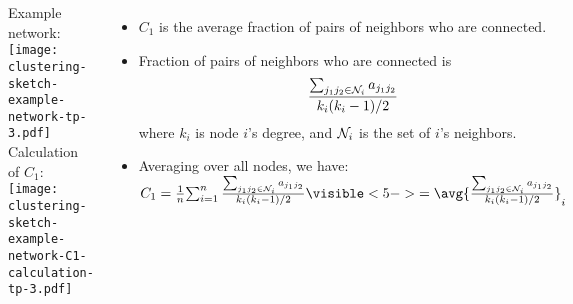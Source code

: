 \begin{frame}

  \begin{block}{}
  \begin{columns}
    Example network:\\
    \texttt{[image: clustering-sketch-example-network-tp-3.pdf]}\\
    Calculation of $C_1$:\\
    \texttt{[image: clustering-sketch-example-network-C1-calculation-tp-3.pdf]}
    \begin{itemize}
    \item<2-> $C_1$ is the \alert{average fraction of 
        pairs of neighbors who are connected}.
    \item<3-> Fraction of pairs of neighbors who are connected is
      $$ \frac{\sum_{j_1 j_2 \in {\cal N}_i} a_{j_1 j_2}}{k_i(k_i-1)/2} $$
      where
      $k_i$ is node $i$'s degree, and 
      ${\cal N}_i$ is the set of $i$'s neighbors.
    \item<4->
      Averaging over all nodes, we have:\\
      $ C_1 = \frac{1}{n}{\sum_{i=1}^{n}\frac{\sum_{j_1 j_2 \in {\cal N}_i} a_{j_1 j_2}}{k_i(k_i-1)/2}} 
      \visible<5->{ = \avg{\frac{\sum_{j_1 j_2 \in {\cal N}_i} a_{j_1 j_2}}{k_i(k_i-1)/2}}_{i} }$
    \end{itemize}
  \end{columns}
  \end{block}

\end{frame}

